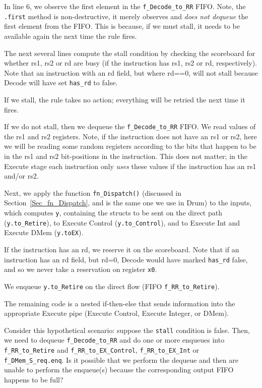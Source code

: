 
In line 6, we observe the first element in the \verb|f_Decode_to_RR|
FIFO.  Note, the \verb|.first| method is non-destructive, {\ie} it
merely observes and \emph{does not dequeue} the first element from the
FIFO.  This is because, if we must stall, it needs to be available
again the next time the rule fires.

The next several lines compute the stall condition by checking the
scoreboard for whether rs1, rs2 or rd are busy (if the instruction has
rs1, rs2 or rd, respectively).  Note that an instruction with an rd
field, but where rd==0, will not stall because Decode will have set
\verb|has_rd| to false.

If we stall, the rule takes no action; everything will be retried the
next time it fires.

If we do not stall, then we dequeue the \verb|f_Decode_to_RR| FIFO.
We read values of the rs1 and rs2 registers.  Note, if the instruction
does not have an rs1 or rs2, here we will be reading some random
registers according to the bits that happen to be in the rs1 and rs2
bit-positions in the instruction.  This does not matter; in the
Execute stage each instruction only \emph{uses} these values if the
instruction has an rs1 and/or rs2.

Next, we apply the function \verb|fn_Dispatch()| (discussed in
Section~\ref{Sec_fn_Dispatch}, and is the same one we use in Drum) to
the inputs, which computes \verb|y|, containing the structs to be sent
on the direct path (\verb|y.to_Retire|), to Execute Control
(\verb|y.to_Control|), and to Execute Int and Execute DMem
(\verb|y.toEX|).

If the instruction has an rd, we reserve it on the scoreboard.  Note
that if an instruction has an rd field, but rd=0, Decode would have
marked \verb|has_rd| false, and so we never take a reservation on
register \verb|x0|.

We enqueue \verb|y.to_Retire| on the direct flow (FIFO
\verb|f_RR_to_Retire|).

The remaining code is a nested if-then-else that sends information
into the appropriate Execute pipe (Execute Control, Execute Integer,
or DMem).

\hdivider

\Exercise

Consider this hypothetical scenario: suppose the \verb|stall|
condition is false.  Then, we need to dequeue \verb|f_Decode_to_RR|
and do one or more enqueues into \verb|f_RR_to_Retire| and
\verb|f_RR_to_EX_Control|, \verb|f_RR_to_EX_Int| or
\verb|f_DMem_S_req.enq|.  Is it possible that we perform the dequeue
and then are unable to perform the enqueue(s) because the
corresponding output FIFO happens to be full?

